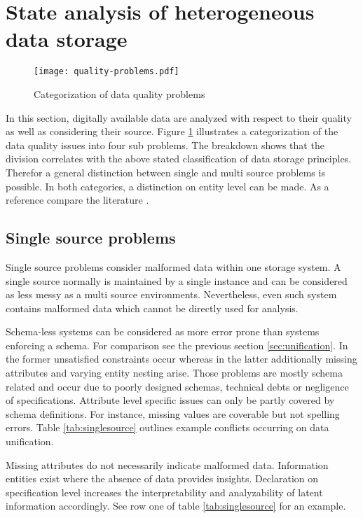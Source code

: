\section{State analysis of heterogeneous data storage\label{sec:stateanalysis}}

\begin{figure}[htb]
  \centering
  \texttt{[image: quality-problems.pdf]}\\
  \caption{Categorization of data quality problems}\label{fig:qualityproblems}
\end{figure}

In this section, digitally available data are analyzed with respect to their quality as well as considering their source. Figure \ref{fig:qualityproblems} illustrates a categorization of the data quality issues into four sub problems. The breakdown shows that the division correlates with the above stated classification of data storage principles. Therefor a general distinction between single and multi source problems is possible. In both categories, a distinction on entity level can be made. As a reference compare the literature \cite{rahm_hai_do_2017}.

\subsection{Single source problems}

Single source problems consider malformed data within one storage system. A single source normally is maintained by a single instance and can be considered as less messy as a multi source environments. Nevertheless, even such system contains malformed data which cannot be directly used for analysis.

Schema-less systems can be considered as more error prone than systems enforcing a schema. For comparison see the previous section \ref{sec:unification}. In the former unsatisfied constraints occur whereas in the latter additionally missing attributes and varying entity nesting arise. Those problems are mostly schema related and occur due to poorly designed schemas, technical debts or negligence of specifications. Attribute level specific issues can only be partly covered by schema definitions. For instance, missing values are coverable but not spelling errors. Table \ref{tab:singlesource} outlines example conflicts occurring on data unification. 

Missing attributes do not necessarily indicate malformed data. Information entities exist where the absence of data provides insights. Declaration on specification level increases the interpretability and analyzability of latent information accordingly. See row one of table \ref{tab:singlesource} for an example.

